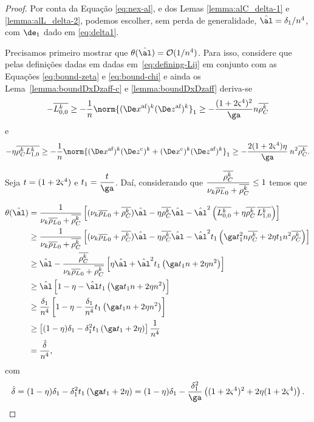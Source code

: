 \begin{proof} Por conta da Equação \eqref{eq:nex-al}, e dos Lemas \ref{lemma:alC_delta-1} e \ref{lemma:alL_delta-2}, podemos escolher, sem perda de generalidade, $\nextal = \delta_{1}/n^{4}$, com $\de_{1}$ dado em \eqref{eq:delta1}. 

Precisamos  primeiro mostrar que $\theta(\nextal)= \Oset(1/n^{4})$. Para isso, considere que pelas definições dadas em dadas em~\eqref{eq:defining-Lij} em conjunto com  as Equações  \eqref{eq:bound-zeta} e \eqref{eq:bound-chi} e ainda  os Lema~\ref{lemma:boundDxDzaff-c} e \ref{lemma:boundDxDzaff} deriva-se 
\[
- \dbvec{L_{0,0}^{k}} \geq - \dfrac{1}{n} \norm{ \dekx  \dekz }_1 \geq - \dfrac{(1 + 2\bdxzstar^{4})^{2} }{\ga} n\rhoCkb
\]
e 
\[
- \eta\rhoCkb  \dbvec{L_{1,0}^{k}} \geq - \dfrac{1}{n} \norm{ \dekx \Dekcoz + \Dekcox \dekz }_1 \geq - \dfrac{2(1+2\bdxzstar^{4})\eta }{\ga}\: n^{2}\rhoCkb.
\]



Seja $t = (1+2\varsigma^{4})$ e $t_1 = \dfrac{t}{\ga}$. 
Daí, considerando que $\dfrac{\overline{\rho_C^{k}} }{\nu_{k} \overline{\rho_L}_0 + \overline{\rho_C^{k}} }\leq 1$ temos que


\[
	\begin{aligned}
		\theta(\nextal)%
						& = \dfrac{1}{\nuk \dbvec{\rho_L}_0 + \rhoCkb }\left[ (\nuk \dbvec{\rho_L}_0 + \rhoCkb )\nextal -  \eta\rhoCkb \nextal - \nextal^{2}\left(\dbvec{L_{0,0}^{k}} + \eta\rhoCkb \, \dbvec{L_{1,0}^{k}} \right) \right] \\
						& \geq \dfrac{1}{\nuk \dbvec{\rho_L}_0 + \rhoCkb }\left[ (\nuk \dbvec{\rho_L}_0 + \rhoCkb )\nextal -  \eta\rhoCkb \nextal - \nextal^{2}t_{1}\left(\ga t_{1}^{2} n\rhoCkb  + 2\eta t_1 n^{2}\rhoCkb  \right) \right]\\
						& \geq \nextal - \dfrac{\rhoCkb }{\nuk \dbvec{\rho_L}_0 + \rhoCkb } \left[   \eta\nextal + \nextal^{2} t_{1}\left(\ga t_1 n + 2\eta  n^{2}  \right) \right]\\
						& \geq \nextal \left[ 1 -  \eta - \nextal t_{1}\left(\ga t_1 n + 2\eta  n^{2}  \right) \right] \\
						& \geq \frac{\delta_{1}}{n^{4}} \left[ 1 -  \eta - \frac{\delta_{1}}{n^{4}}t_{1}\left(\ga t_1 n + 2\eta  n^{2}  \right) \right] \\
						& \geq 	 \left[ (1 -  \eta)\delta_{1} - \delta_{1}^{2}t_{1}\left(\ga t_1  + 2\eta    \right) \right] \frac{1}{n^{4}}	\\
						& = \frac{\nextdel}{n^{4}},		
		\end{aligned}
	\]
	com 	\begin{equation}
		\label{eq:nextdelta}
		\nextdel = 
	(1 -  \eta)\delta_{1} - \delta_{1}^{2}t_{1}\left(\ga t_{1}  + 2\eta    \right) = (1 -  \eta)\delta_{1} - \dfrac{\delta_{1}^{2}}{\ga}\left((1+2\bdxzstar^{4})^{2}  + 2\eta(1+2\bdxzstar^{4})    \right).
	\end{equation} 
	

\end{proof}
